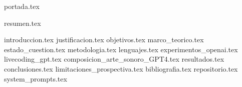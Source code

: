 \documentclass[a4paper,openany,oneside,12pt]{report}
\begin{document}
  {portada.tex}
  \setcounter{page}{2} %

  {resumen.tex}
  \clearpage
  
  

  \tableofcontents
  \clearpage

  \listoffigures 
  \clearpage

  \listoftables
  \clearpage

  \printglossary[title=Índice de acrónimos, toctitle=Índice de acrónimos]
  \clearpage


  {introduccion.tex}
  {justificacion.tex}
  {objetivos.tex}
  {marco_teorico.tex}
  {estado_cuestion.tex}
  {metodologia.tex}
  {lenguajes.tex}
  {experimentos_openai.tex}
  {livecoding_gpt.tex}
  {composicion_arte_sonoro_GPT4.tex}
  {resultados.tex}
  {conclusiones.tex}
  {limitaciones_prospectiva.tex}
  {bibliografia.tex}
  {repositorio.tex}
  {system_prompts.tex}


  \printindex %
  \clearpage
\end{document}
